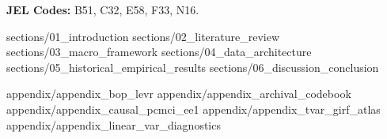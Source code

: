 \vspace{0.4em}
\noindent\textbf{JEL Codes:} B51, C32, E58, F33, N16.

\clearpage

{sections/01_introduction}
{sections/02_literature_review}
{sections/03_macro_framework}
{sections/04_data_architecture}
{sections/05_historical_empirical_results}
{sections/06_discussion_conclusion}

\clearpage
{%
\setlength{\bibsep}{2.5pt}


}

\clearpage
\begin{subappendices}
{appendix/appendix_bop_levr}
\clearpage
{appendix/appendix_archival_codebook}
\clearpage
{appendix/appendix_causal_pcmci_ee1}
\clearpage
{appendix/appendix_tvar_girf_atlas}
\clearpage
{appendix/appendix_linear_var_diagnostics}
\end{subappendices}

\endgroup  %
